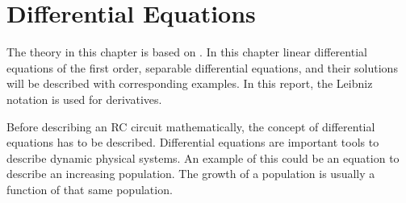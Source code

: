 \chapter{Differential Equations} 
The theory in this chapter is based on \cite{diffandcomplex}. In this chapter linear differential equations of the first order, separable differential equations, and their solutions will be described with corresponding examples. In this report, the Leibniz notation is used for derivatives. 

Before describing an RC circuit mathematically, the concept of differential equations has to be described. Differential equations are important tools to describe dynamic physical systems. An example of this could be an equation to describe an increasing population. The growth of a population is usually a function of that same population.


